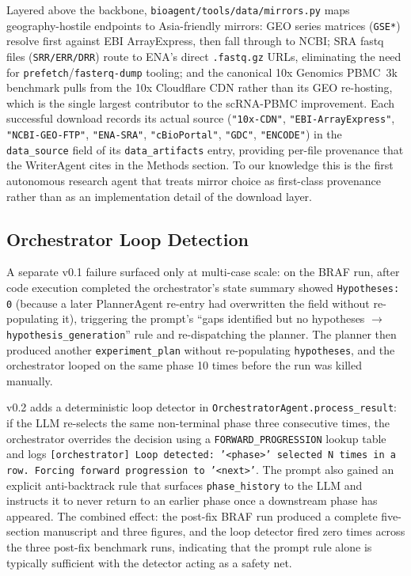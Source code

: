 \documentclass[11pt]{article}
\begin{document}
Layered above the backbone, \texttt{bioagent/tools/data/mirrors.py}
maps geography-hostile endpoints to Asia-friendly mirrors:
GEO series matrices (\texttt{GSE*}) resolve first against EBI
ArrayExpress, then fall through to NCBI;
SRA fastq files (\texttt{SRR/ERR/DRR}) route to ENA's direct
\texttt{.fastq.gz} URLs, eliminating the need for
\texttt{prefetch}/\texttt{fasterq-dump} tooling;
and the canonical 10x Genomics PBMC~3k benchmark pulls from the 10x
Cloudflare CDN rather than its GEO re-hosting, which is the single
largest contributor to the scRNA-PBMC improvement.
Each successful download records its actual source
(\texttt{"10x-CDN"}, \texttt{"EBI-ArrayExpress"},
\texttt{"NCBI-GEO-FTP"}, \texttt{"ENA-SRA"}, \texttt{"cBioPortal"},
\texttt{"GDC"}, \texttt{"ENCODE"}) in the \texttt{data\_source} field
of its \texttt{data\_artifacts} entry, providing per-file provenance
that the WriterAgent cites in the Methods section.
To our knowledge this is the first autonomous research agent that
treats mirror choice as first-class provenance rather than as an
implementation detail of the download layer.

\subsection{Orchestrator Loop Detection}\label{sec:orchestrator}

A separate v0.1 failure surfaced only at multi-case scale: on the
BRAF run, after code execution completed the orchestrator's state
summary showed \texttt{Hypotheses: 0} (because a later PlannerAgent
re-entry had overwritten the field without re-populating it),
triggering the prompt's
``gaps identified but no hypotheses $\rightarrow$
\texttt{hypothesis\_generation}'' rule and re-dispatching the planner.
The planner then produced another \texttt{experiment\_plan} without
re-populating \texttt{hypotheses}, and the orchestrator looped on the
same phase 10 times before the run was killed manually.

v0.2 adds a deterministic loop detector in
\texttt{OrchestratorAgent.process\_result}: if the LLM re-selects the
same non-terminal phase three consecutive times, the orchestrator
overrides the decision using a \texttt{FORWARD\_PROGRESSION} lookup
table and logs \texttt{[orchestrator] Loop detected: '<phase>' selected
N times in a row. Forcing forward progression to '<next>'}.
The prompt also gained an explicit anti-backtrack rule that surfaces
\texttt{phase\_history} to the LLM and instructs it to never return to
an earlier phase once a downstream phase has appeared.
The combined effect: the post-fix BRAF run produced a complete
five-section manuscript and three figures, and the loop detector fired
zero times across the three post-fix benchmark runs, indicating that
the prompt rule alone is typically sufficient with the detector acting
as a safety net.
\end{document}
